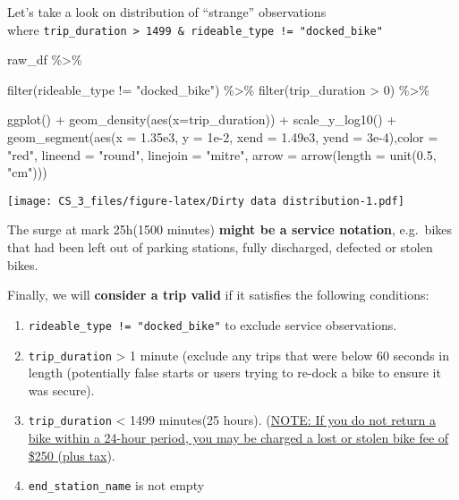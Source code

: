 \documentclass[
]{article}
\newenvironment{Shaded}{\begin{snugshade}}{\end{snugshade}}
\newcommand{\AttributeTok}[1]{\textcolor[rgb]{0.77,0.63,0.00}{#1}}
\newcommand{\DecValTok}[1]{\textcolor[rgb]{0.00,0.00,0.81}{#1}}
\newcommand{\FloatTok}[1]{\textcolor[rgb]{0.00,0.00,0.81}{#1}}
\newcommand{\FunctionTok}[1]{\textcolor[rgb]{0.00,0.00,0.00}{#1}}
\newcommand{\NormalTok}[1]{#1}
\newcommand{\SpecialCharTok}[1]{\textcolor[rgb]{0.00,0.00,0.00}{#1}}
\newcommand{\StringTok}[1]{\textcolor[rgb]{0.31,0.60,0.02}{#1}}
\begin{document}
Let's take a look on distribution of ``strange'' observations\\
where
\texttt{trip\_duration\ \textgreater{}\ 1499\ \&\ rideable\_type\ !=\ "docked\_bike"}

\begin{Shaded}
\begin{Highlighting}[]
\NormalTok{raw\_df }\SpecialCharTok{\%\textgreater{}\%} 

  \FunctionTok{filter}\NormalTok{(rideable\_type }\SpecialCharTok{!=} \StringTok{"docked\_bike"}\NormalTok{) }\SpecialCharTok{\%\textgreater{}\%}
  \FunctionTok{filter}\NormalTok{(trip\_duration }\SpecialCharTok{\textgreater{}} \DecValTok{0}\NormalTok{) }\SpecialCharTok{\%\textgreater{}\%} 

  
  \FunctionTok{ggplot}\NormalTok{() }\SpecialCharTok{+}
  \FunctionTok{geom\_density}\NormalTok{(}\FunctionTok{aes}\NormalTok{(}\AttributeTok{x=}\NormalTok{trip\_duration)) }\SpecialCharTok{+}
  \FunctionTok{scale\_y\_log10}\NormalTok{() }\SpecialCharTok{+}
  \FunctionTok{geom\_segment}\NormalTok{(}\FunctionTok{aes}\NormalTok{(}\AttributeTok{x =} \FloatTok{1.35e3}\NormalTok{, }\AttributeTok{y =} \FloatTok{1e{-}2}\NormalTok{, }\AttributeTok{xend =} \FloatTok{1.49e3}\NormalTok{, }\AttributeTok{yend =} \FloatTok{3e{-}4}\NormalTok{),}\AttributeTok{color =} \StringTok{"red"}\NormalTok{,}
                 \AttributeTok{lineend =} \StringTok{"round"}\NormalTok{, }\AttributeTok{linejoin =} \StringTok{"mitre"}\NormalTok{,}
                  \AttributeTok{arrow =} \FunctionTok{arrow}\NormalTok{(}\AttributeTok{length =} \FunctionTok{unit}\NormalTok{(}\FloatTok{0.5}\NormalTok{, }\StringTok{"cm"}\NormalTok{)))}
\end{Highlighting}
\end{Shaded}

\texttt{[image: CS\_3\_files/figure-latex/Dirty data distribution-1.pdf]}

The surge at mark 25h(1500 minutes) \textbf{might be a service
notation}, e.g.~bikes that had been left out of parking stations, fully
discharged, defected or stolen bikes.

Finally, we will \textbf{consider a trip valid} if it satisfies the
following conditions:

\begin{enumerate}
\def\labelenumi{\arabic{enumi}.}
\item
  \texttt{rideable\_type\ !=\ "docked\_bike"} to exclude service
  observations.
\item
  \texttt{trip\_duration} \textgreater{} 1 minute (exclude any trips
  that were below 60 seconds in length (potentially false starts or
  users trying to re-dock a bike to ensure it was secure).
\item
  \texttt{trip\_duration} \textless{} 1499 minutes(25 hours).
  (\href{https://help.divvybikes.com/hc/en-us/articles/360033484791-What-if-I-keep-a-bike-out-too-long-}{NOTE:
  If you do not return a bike within a 24-hour period, you may be
  charged a lost or stolen bike fee of \$250 (plus tax}).
\item
  \texttt{end\_station\_name} is not empty
\end{enumerate}
\end{document}
